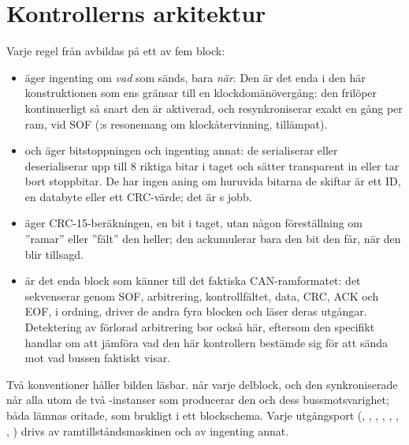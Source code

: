 
\section{Kontrollerns arkitektur}
\label{c11:sec:arch}

Varje regel från  avbildas på ett av fem block:
\begin{itemize}
  \item \textbf{} äger ingenting om \emph{vad} som sänds, bara \emph{när}. Den är det
    enda i den här konstruktionen som ens gränsar till en klockdomänövergång: den frilöper
    kontinuerligt så snart den är aktiverad, och resynkroniserar exakt en gång per ram, vid SOF
    (:s resonemang om klockåtervinning, tillämpat).
  \item \textbf{} och \textbf{} äger bitstoppningen och
    ingenting annat: de serialiserar eller deserialiserar upp till 8 riktiga bitar i taget och sätter
    transparent in eller tar bort stoppbitar. De har ingen aning om huruvida bitarna de skiftar är
    ett ID, en databyte eller ett CRC-värde; det är s jobb.
  \item \textbf{} äger CRC-15-beräkningen, en bit i taget, utan någon föreställning om
    ”ramar” eller ”fält” den heller; den ackumulerar bara den bit den får, när den blir tillsagd.
  \item \textbf{} är det enda block som känner till det faktiska CAN-ramformatet:
    det sekvenserar genom SOF, arbitrering, kontrollfältet, data, CRC, ACK och EOF, i ordning, driver
    de andra fyra blocken och läser deras utgångar. Detektering av förlorad arbitrering bor också
    här, eftersom den specifikt handlar om att jämföra vad den här kontrollern bestämde sig för att
    sända mot vad bussen faktiskt visar.
\end{itemize}


Två konventioner håller bilden läsbar.  når varje delblock, och den synkroniserade
 når alla utom de två -instanser som producerar den och dess
bussmotsvarighet; båda lämnas oritade, som brukligt i ett blockschema. Varje utgångsport
(, , , , , ,
, ) drivs av ramtillståndsmaskinen och av ingenting annat.

